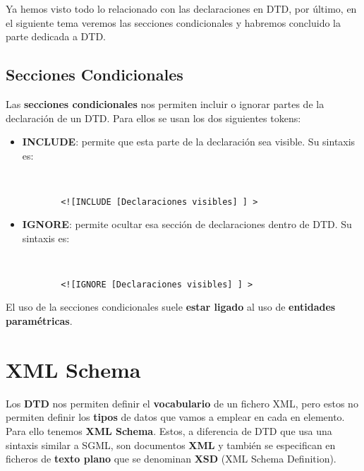 Ya hemos visto todo lo relacionado con las declaraciones en DTD, por último, en el siguiente tema veremos las secciones condicionales y habremos concluido la parte dedicada a DTD.

\subsection{Secciones Condicionales}
Las \textbf{secciones condicionales} nos permiten incluir o ignorar partes de la declaración de un DTD. Para ellos se usan los dos siguientes tokens:

\begin{itemize}
    \item \textbf{INCLUDE}: permite que esta parte de la declaración sea visible. Su sintaxis es:

    \begin{figure}[H]
        \begin{tcolorbox}[sharp corners, colback=yellow!30, colframe=white!20]
            \scriptsize
            \begin{verbatim}


  <![INCLUDE [Declaraciones visibles] ] >
            \end{verbatim}
        \end{tcolorbox}
    \end{figure}

    \item \textbf{IGNORE}: permite ocultar esa sección de declaraciones dentro de DTD. Su sintaxis es:

    \begin{figure}[H]
        \begin{tcolorbox}[sharp corners, colback=yellow!30, colframe=white!20]
            \scriptsize
            \begin{verbatim}


  <![IGNORE [Declaraciones visibles] ] >
            \end{verbatim}
        \end{tcolorbox}
    \end{figure}
\end{itemize}

El uso de la secciones condicionales suele \textbf{estar ligado} al uso de \textbf{entidades paramétricas}.

\section{XML Schema}
Los \textbf{DTD} nos permiten definir el \textbf{vocabulario} de un fichero XML, pero estos no permiten definir los \textbf{tipos} de datos que vamos a emplear en cada en elemento. Para ello tenemos \textbf{XML Schema}. Estos, a diferencia de DTD que usa una sintaxis similar a SGML, son documentos \textbf{XML} y también se especifican en ficheros de \textbf{texto plano} que se denominan \textbf{XSD} (XML Schema Definition).

